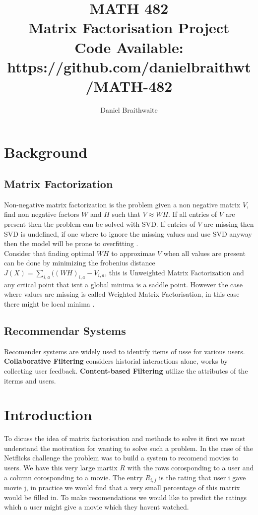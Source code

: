 \documentclass{article}
\title{%
	MATH 482\\
	\large Matrix Factorisation Project \\
	\small Code Available: https://github.com/danielbraithwt/MATH-482
}
\author{Daniel Braithwaite}
\begin{document}
\maketitle

\section{Background}
\subsection{Matrix Factorization}
Non-negative matrix factorization is the problem given a non negative matrix $V$, find non negative factors $W$ and $H$ such that $V \approx WH$. If all entries of $V$ are present then the problem can be solved with SVD. If entries of $V$ are missing then SVD is undefined, if one where to ignore the missing values and use SVD anyway then the model will be prone to overfitting \cite{koren2009matrix}.\\

Consider that finding optimal $WH$ to approximae $V$ when all values are present can be done by minimizing the frobenius distance $J(X) = \sum_{i,a} ((WH)_{i,a} - V_{i,a}$, this is Unweighted Matrix Factorization and any crtical point that isnt a global minima is a saddle point. However the case where values are missing is called Weighted Matrix Factorisation, in this case there might be local minima \cite{srebro2003weighted}.

\subsection{Recommendar Systems}
Recomender systems are widely used to identify items of usse for various users. \textbf{Collaborative Filtering} considers historial interactions alone, works by collecting user feedback. \textbf{Content-based Filtering} utilize the  attributes of the iterms and users.

\section{Introduction}
To dicuss the idea of matrix factorisation and methods to solve it first we must understand the motivation for wanting to solve such a problem. In the case of the Netflicks challenge the problem was to build a system to recomend movies to users. We have this very large martix $R$ with the rows corosponding to a user and a column corosponding to a movie. The entry $R_{i,j}$ is the rating that user i gave movie j, in practice we would find that a very small percentage of this matrix would be filled in. To make recomendations we would like to predict the ratings which a user might give a movie which they havent watched.\\
\end{document}
